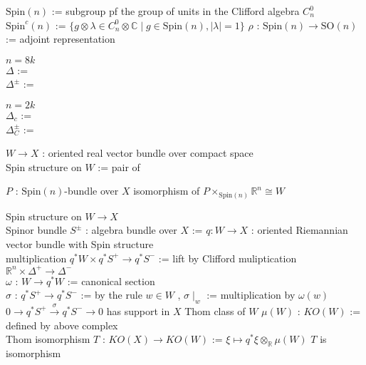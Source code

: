 \begin{Definition}[スピン群とスピン表現]
\itemdefi
  \Define \(\text{Spin}(n)\) := subgroup pf the group of units in the Clifford algebra \(C^0_n\) \\
  \Define \(\text{Spin}^c(n)\) := \(\{ g \otimes \lambda \in C^0_n \otimes \mathbb{C} \mid g \in \text{Spin}(n) , \lvert \lambda \rvert = 1\}\)
\itemdefi
  \Define \(\rho\) : \(\text{Spin}(n) \to \text{SO}(n)\) := adjoint representation
\itemdefi
\end{Definition}

\begin{Definition}
\itemwhen
  \IfHold \(n = 8k\) \\
\itemdefi
  \(\Delta\) := \WIP \\
  \(\Delta^{\pm}\) := \WIP
\end{Definition}

\begin{Definition}
\itemwhen
  \IfHold \(n = 2k\) \\
\itemdefi
  \(\Delta_c\) := \WIP \\
  \(\Delta_C^{\pm}\) := \WIP
\end{Definition}

\begin{Definition}[スピン構造]
\itemdefi
  \For \(W \to X\) : oriented real vector bundle over compact space \\
  \Define Spin structure on \(W\) := pair of
  \begin{itemize}
    \itemenum \(P\) : \(\text{Spin}(n)\)-bundle over \(X\)
    \itemenum isomorphism of \(P \times_{\text{Spin}(n)} \mathbb{R}^n \cong W\)
  \end{itemize}
\end{Definition}

\begin{Theorem}
\itemdefi
  \For Spin structure on \(W \to X\) \\
  \Define Spinor bundle \(S^{\pm}\) : algebra bundle over \(X\) := \WIP
\itemdefi
  \For \(q : W \to X\) : oriented Riemannian vector bundle with Spin structure \\
  \Define multiplication \(q^* W \times q^* {S^+} \to q^*{S^-}\) := lift by Clifford muliptication \(\mathbb{R}^n \times \Delta^+ \to \Delta^-\) \\
  \Define \(\omega\) : \(W \to q^* W\) := canonical section \\
  \Define \(\sigma\) : \(q^* {S^+} \to q^* {S^-}\) := by the rule \(w \in W\) , \(\sigma\mid_w\) := multiplication by \(\omega(w)\)
\itemprop
  \Then \(0 \to q^* {S^+} \overset{\sigma}{\to} q^* {S^-} \to 0\) has support in \(X\)
\itemdefi
  \Define Thom class of \(W\) \(\mu(W)\) : \(KO(W)\) := defined by above complex \\
  \Define Thom isomorphism \(T\) : \(KO(X) \to KO(W)\) := \(\xi \mapsto q^*\xi \otimes_{\mathbb{R}} \mu(W)\)
\itemprop
  \(T\) is isomorphism
\end{Theorem}

